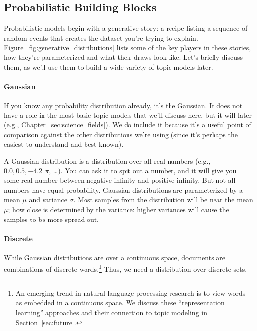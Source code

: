 \begin{figure}
  \caption{}
  \label{fig:distribution_examples}
\end{figure}

\subsection{Probabilistic Building Blocks}
\label{sec:intro_building_blocks}

Probabilistic models begin with a generative story: a recipe listing a sequence of random events
that creates the dataset you're trying to explain.
Figure~\ref{fig:generative_distributions} lists some of the key players in these
stories, how they're parameterized and what their draws look like.  Let's
briefly discuss them, as we'll use them to build a wide variety of topic models
later.

\paragraph{Gaussian} If you know any probability distribution already, it's the
Gaussian.  It does not have a role in the most basic topic models that we'll
discuss here, but it will later (e.g., Chapter~\ref{sec:science_fields}).  We do
include it because it's a useful point of comparison against the other
distributions we're using (since it's perhaps the easiest to understand and best
known).

A Gaussian distribution is a distribution over all real numbers (e.g., $0.0, 0.5,
-4.2, \pi$, \dots).  You can ask it to spit out a number, and it will give you
some real number between negative infinity and positive infinity.  But not all
numbers have equal probability.  Gaussian distributions are parameterized by a
mean $\mu$ and variance $\sigma$.  Most samples from the distribution will be
near the mean $\mu$; how close is determined by the variance: higher variances
will cause the samples to be more spread out.

\paragraph{Discrete}

While Gaussian distributions are over a continuous space, documents are
combinations of discrete words.\footnote{An emerging trend in natural language
  processing research is to view words as embedded in a continuous space.  We
  discuss these ``representation learning'' approaches and their connection to
  topic modeling in Section~\ref{sec:future}.}   Thus, we need a distribution
over discrete sets.

